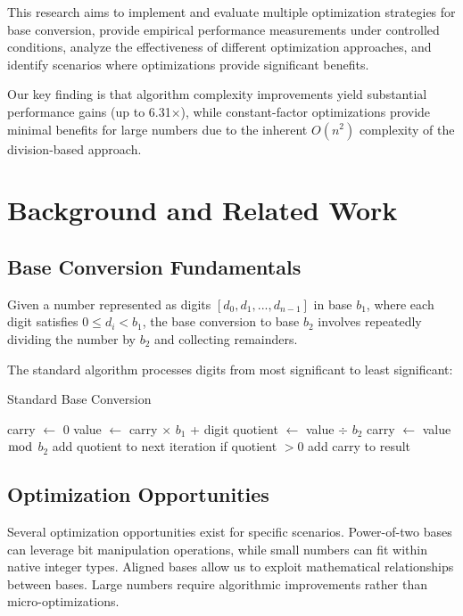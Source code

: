 \documentclass[10pt]{article}
\begin{document}
This research aims to implement and evaluate multiple optimization strategies for base conversion, provide empirical performance measurements under controlled conditions, analyze the effectiveness of different optimization approaches, and identify scenarios where optimizations provide significant benefits.

Our key finding is that algorithm complexity improvements yield substantial performance gains (up to 6.31×), while constant-factor optimizations provide minimal benefits for large numbers due to the inherent $O(n^2)$ complexity of the division-based approach.

\section{Background and Related Work}

\subsection{Base Conversion Fundamentals}

Given a number represented as digits $[d_0, d_1, ..., d_{n-1}]$ in base $b_1$, where each digit satisfies $0 \leq d_i < b_1$, the base conversion to base $b_2$ involves repeatedly dividing the number by $b_2$ and collecting remainders.

The standard algorithm processes digits from most significant to least significant:
\begin{algorithm}[H]
\caption{Standard Base Conversion}
\begin{algorithmic}[1]
  \STATE carry $\gets$ 0
    \STATE value $\gets$ carry $\times$ $b_1$ + digit
    \STATE quotient $\gets$ value $\div$ $b_2$
    \STATE carry $\gets$ value $\bmod$ $b_2$
    \STATE add quotient to next iteration if quotient $> 0$
  \ENDFOR
  \STATE add carry to result
\ENDWHILE
\end{algorithmic}
\end{algorithm}

\subsection{Optimization Opportunities}

Several optimization opportunities exist for specific scenarios. Power-of-two bases can leverage bit manipulation operations, while small numbers can fit within native integer types. Aligned bases allow us to exploit mathematical relationships between bases. Large numbers require algorithmic improvements rather than micro-optimizations.
\end{document}
